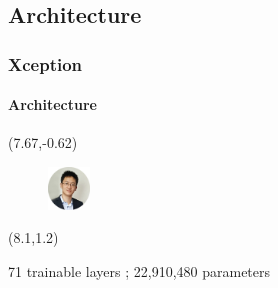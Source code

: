 \subsection{Architecture}
\begin{frame}
\frametitle{Xception}
\framesubtitle{Architecture} 

\begin{textblock}{15}(7.67,-0.62)
	\begin{figure}[H]
		\includegraphics[width=0.1\textwidth]{Images/Team/WeihaoZHOU.png} 
	\end{figure}
\end{textblock}

\begin{textblock}{1}(8.1,1.2)
	\centerline{71 trainable layers ; 22,910,480 parameters}
\end{textblock}

\begin{center}
	

\end{center}
\end{frame}
